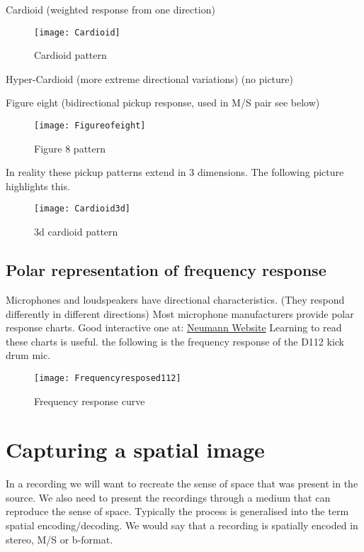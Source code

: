 Cardioid (weighted response from one direction)

\begin{figure}[H]
\centering
\texttt{[image: Cardioid]}\caption{Cardioid pattern}
\label{fig:cardioid}
\end{figure}

Hyper-Cardioid (more extreme directional variations) (no picture)

Figure eight (bidirectional pickup response, used in M/S pair see below)
\begin{figure}[H]
\centering
\texttt{[image: Figureofeight]}\caption{Figure 8 pattern}
\label{fig:figure8}
\end{figure}

In reality these pickup patterns extend in 3 dimensions. The following picture highlights this.
\begin{figure}[H]
\centering
\texttt{[image: Cardioid3d]}\caption{3d cardioid pattern}
\label{fig:3dpattern}
\end{figure}

\subsection{Polar representation of frequency response}

Microphones and loudspeakers have directional characteristics. (They respond differently in different directions)
Most microphone manufacturers provide polar response charts.
Good interactive one at: \href{http://www.neumann.com/?lang=en&id=current_microphones&cid=km180_data#}{Neumann Website}
Learning to read these charts is useful. the following is the frequency response of the D112 kick drum mic.

\begin{figure}[H]
\centering
\texttt{[image: Frequencyresposed112]}\caption{Frequency response curve}
\label{fig:freqresponsecurve}
\end{figure}


\section{Capturing a spatial image}
In a recording we will want to recreate the sense of space that was present in the source. We also need to present the recordings through a medium that can reproduce the sense of space. Typically the process is generalised into the term spatial encoding/decoding. We would say that a recording is spatially encoded in stereo, M/S or b-format.

